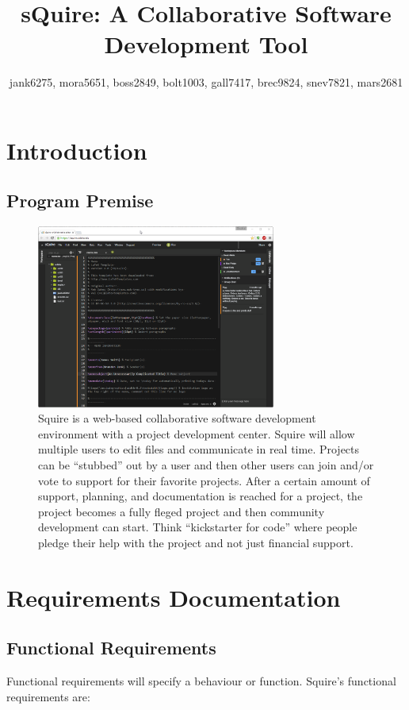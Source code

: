 \documentclass[11pt]{report}
\title{sQuire: A Collaborative Software Development Tool}
\author{jank6275, mora5651, boss2849, bolt1003, gall7417, brec9824, snev7821, mars2681}
\begin{document}
\maketitle

\tableofcontents

\chapter{Introduction}

\section{Program Premise}
    \begin{figure}
      \begin{center}
        \includegraphics[width=0.7\textwidth]{squire}
      \end{center}
      \caption{Squire is a web-based collaborative software development environment with a project development center. Squire will allow multiple users to edit files and communicate in real time. Projects can be ``stubbed'' out by a user and then other users can join and/or vote to support for their favorite projects. After a certain amount of support, planning, and documentation is reached for a project, the project becomes a fully fleged project and then community development can start. Think ``kickstarter for code'' where people pledge their help with the project and not just financial support.}
    \end{figure}


\chapter{Requirements Documentation}

\section{Functional Requirements}
    Functional requirements will specify a behaviour or function. Squire's functional requirements are:
    
\end{document}
